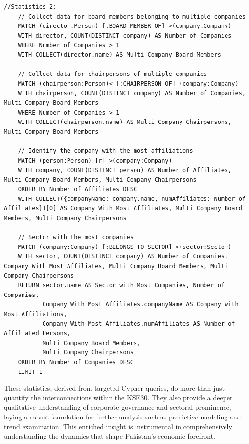 \documentclass[12pt]{article}
\begin{document}
\begin{lstlisting}[frame=single]
    //Statistics 2: 
    // Collect data for board members belonging to multiple companies
    MATCH (director:Person)-[:BOARD_MEMBER_OF]->(company:Company)
    WITH director, COUNT(DISTINCT company) AS Number of Companies
    WHERE Number of Companies > 1
    WITH COLLECT(director.name) AS Multi Company Board Members
    
    // Collect data for chairpersons of multiple companies
    MATCH (chairperson:Person)<-[:CHAIRPERSON_OF]-(company:Company)
    WITH chairperson, COUNT(DISTINCT company) AS Number of Companies, Multi Company Board Members
    WHERE Number of Companies > 1
    WITH COLLECT(chairperson.name) AS Multi Company Chairpersons, Multi Company Board Members
    
    // Identify the company with the most affiliations
    MATCH (person:Person)-[r]->(company:Company)
    WITH company, COUNT(DISTINCT person) AS Number of Affiliates, Multi Company Board Members, Multi Company Chairpersons
    ORDER BY Number of Affiliates DESC
    WITH COLLECT({companyName: company.name, numAffiliates: Number of Affiliates})[0] AS Company With Most Affiliates, Multi Company Board Members, Multi Company Chairpersons
    
    // Sector with the most companies
    MATCH (company:Company)-[:BELONGS_TO_SECTOR]->(sector:Sector)
    WITH sector, COUNT(DISTINCT company) AS Number of Companies, Company With Most Affiliates, Multi Company Board Members, Multi Company Chairpersons
    RETURN sector.name AS Sector with Most Companies, Number of Companies, 
           Company With Most Affiliates.companyName AS Company with Most Affiliations, 
           Company With Most Affiliates.numAffiliates AS Number of Affiliated Persons,
           Multi Company Board Members, 
           Multi Company Chairpersons
    ORDER BY Number of Companies DESC
    LIMIT 1
\end{lstlisting}

These statistics, derived from targeted Cypher queries, do more than just quantify the interconnections within the KSE30. They also provide a deeper qualitative understanding of corporate governance and sectoral prominence, laying a robust foundation for further analysis such as predictive modeling and trend examination. This enriched insight is instrumental in comprehensively understanding the dynamics that shape Pakistan's economic forefront.
\end{document}
